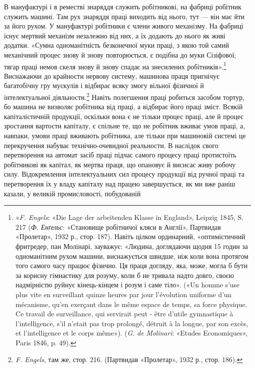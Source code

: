 В мануфактурі і в реместві знаряддя служить робітникові,
на фабриці робітник служить машині. Там рух знаряддя праці
виходить від нього, тут — він має йти за його рухом. У мануфактурі
робітники є члени живого механізму. На фабриці існує
мертвий механізм незалежно від них, а їх додають до нього як
живі додатки. «Сумна одноманітність безконечної муки праці, з
якою той самий механічний процес знову й знову повторюється, є
подібна до муки Сізіфової; тягар праці немов скеля знову й знову
спадає на знесилених робітників».\footnote{
«\emph{F. Engels}: «Die Lage der arbeitenden Klasse in England», Leipzig
1845, S. 217 (\emph{Ф. Енґельс}: «Становище робітничої кляси в Англії»,
Партвидав «Пролетар», 1932 р., стор. 187). Навіть цілком ординарний,
«оптимістичний фритредер, пан Молінарі, зауважує: «Людина, доглядаючи
щодня 15 годин за одноманітним рухом машини, виснажується
швидше, ніж коли вона протягом того самого часу працює фізично. Ця праця
догляду, яка, може, могла б бути за корисну гімнастику для розуму,
коли б не тривала надто довго, своєю надмірністю руйнує кінець-кінцем
і розум і саме тіло». («Un homme s’use plus vite en surveillant quinze
heures par jour l’évolution uniforme d’un mécanisme, qu’en exerçant dans
le même espace de temps, sa force physique. Ce travail de surveillance,
qui servirait peut - être d’utile gymnastique à l’intelligence, s’il n’etait pas
trop prolongé, détruit à la longue, par son excès, et l’intelligence et le corps
même»). (\emph{G. de Molinari}: «Etudes Economiques», Paris 1846, p. 49).
} Виснажаючи до крайности
нервову систему, машинова праця пригнічує багатобічну гру
мускулів і відбирає всяку змогу вільної фізичної й інтелектуальної
діяльности.\footnote{
\emph{F. Engels}, там же, стор. 216. (Партвидав «Пролетар», 1932 р.,
стор. 186).
} Навіть полегшення праці робиться засобом тортур,
бо машина не визволяє робітника від праці, а відбирає його
праці зміст. Всякій капіталістичній продукції, оскільки вона є
не тільки процес праці, але й процес зростання вартости капіталу,
є спільне те, що не робітник вживає умов праці, а, навпаки,
умови праці вживають робітника, але тільки при машиновій
системі це перекручення набуває технічно-очевидної реальности.
В наслідок свого перетворення на автомат засіб праці підчас
самого процесу праці протистоїть робітникові як капітал,
як мертва праця, що опановує й висисає живу робочу силу. Відокремлення
інтелектуальних сил процесу продукції від ручної
праці та перетворення їх у владу капіталу над працею завершується,
як ми вже раніш казали, у великій промисловості, побудованій
